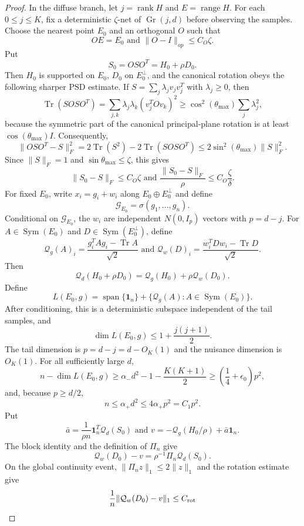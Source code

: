 \documentclass[11pt]{article}
\numberwithin{equation}{section}
\theoremstyle{definition}
\theoremstyle{remark}
\newcommand{\1}{\boldsymbol 1}
\newcommand{\PiZero}{\Pi_n}
\begin{document}
\begin{aiblock}
\begin{proof}
  In the diffuse branch, let $j=\operatorname{rank}H$ and
  $E=\operatorname{range}H$. For each $0\le j\le K$, fix
  a deterministic $\zeta$-net of $\operatorname{Gr}(j,d)$
  before observing the samples. Choose the nearest point
  $E_0$ and an orthogonal $O$ such that
  \[
    OE=E_0\text{ and }\|O-I\|_{op}\le C_O\zeta.
  \]
  Put
  \[
    S_0=OSO^T=H_0+\rho D_0.
  \]
  Then $H_0$ is supported on $E_0$, $D_0$ on $E_0^\perp$,
  and the canonical rotation obeys the following sharper
  PSD estimate. If $S=\sum_j\lambda_jv_jv_j^T$ with
  $\lambda_j\ge0$, then
  \[
    \operatorname{Tr}(SOSO^T) =\sum_{j,k}\lambda_j\lambda_k
    (v_j^TOv_k)^2 \ge\cos^2(\theta_{\max})\sum_j\lambda_j^2,
  \]
  because the symmetric part of the canonical
  principal-plane rotation is at least
  $\cos(\theta_{\max})I$. Consequently,
  \[
    \|OSO^T-S\|_F^2 =2\operatorname{Tr}(S^2)-2\operatorname
    {Tr}(SOSO^T) \le2\sin^2(\theta_{\max})\|S\|_F^2.
  \]
  Since $\|S\|_F=1$ and $\sin\theta_{\max}\le\zeta$, this
  gives
  \[
    \|S_0-S\|_F\le C_O\zeta\text{ and }\frac{\|S_0-S\|_F}
    {\rho}\le C_O\frac\zeta\delta.
  \]
  For fixed $E_0$, write $x_i=g_i+w_i$ along
  $E_0\oplus E_0^\perp$ and define
  \[
    \mathcal G_{E_0}=\sigma(g_1,\ldots,g_n).
  \]
  Conditional on $\mathcal G_{E_0}$, the $w_i$ are
  independent $N(0,I_p)$ vectors with $p=d-j$. For
  $A\in\operatorname{Sym}(E_0)$ and
  $D\in\operatorname{Sym}(E_0^\perp)$, define
  \[
    \mathcal Q_g(A)_i=\frac{g_i^TAg_i-\operatorname{Tr}A}
    {\sqrt2}\text{ and } \mathcal Q_w(D)_i=
    \frac{w_i^TDw_i-\operatorname{Tr}D}{\sqrt2}.
  \]
  Then
  \[
    \mathcal Q_d(H_0+\rho D_0)=\mathcal Q_g(H_0)+\rho
    \mathcal Q_w(D_0).
  \]
  Define
  \[
    L(E_0,g)=\operatorname{span}\{\1_n\}+\{\mathcal Q_g(A):
    A\in\operatorname{Sym}(E_0)\}.
  \]
  After conditioning, this is a deterministic subspace
  independent of the tail samples, and
  \[
    \dim L(E_0,g)\le1+\frac{j(j+1)}2.
  \]
  The tail dimension is $p=d-j=d-O_K(1)$ and the nuisance
  dimension is $O_K(1)$. For all sufficiently large $d$,
  \[
    n-\dim L(E_0,g)\ge\alpha_-d^2-1-\frac{K(K+1)}2\ge
    \left(\frac14+\epsilon_0\right)p^2,
  \]
  and, because $p\ge d/2$,
  \[
    n\le\alpha_+d^2\le4\alpha_+p^2=C_1p^2.
  \]
  Put
  \[
    \bar a=\frac1{\rho n}\1_n^T\mathcal Q_d(S_0)\text{ and
    } v=-\mathcal Q_g(H_0/\rho)+\bar a\1_n.
  \]
  The block identity and the definition of $\PiZero$ give
  \[
    \mathcal Q_w(D_0)-v=\rho^{-1}\PiZero\mathcal Q_d(S_0).
  \]
  On the global continuity event, $\|\PiZero z\|_1\le2
  \|z\|_1$ and the rotation estimate give
  \[
    \frac1n\|\mathcal Q_w(D_0)-v\|_1 \le C_{\rm rot}
\]
\end{proof}
\end{aiblock}
\end{document}

